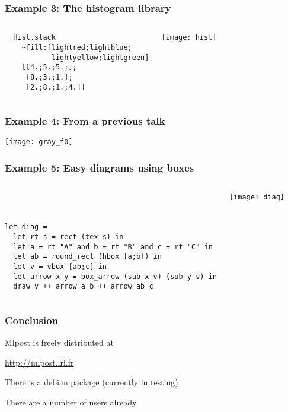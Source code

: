 \documentclass[nodefaultblocks]{beamer}
\begin{document}
\begin{frame}[fragile]
\frametitle{Example 3: The histogram library}
\begin{columns}
\begin{verbatim}
  Hist.stack 
    ~fill:[lightred;lightblue;
           lightyellow;lightgreen]
    [[4.;5.;5.;]; 
     [8.;3.;1.]; 
     [2.;8.;1.;4.]]  
\end{verbatim}
\begin{center}
  \texttt{[image: hist]}
\end{center}

\end{columns}

\end{frame}
\begin{frame}
\frametitle{Example 4: From a previous talk}

\begin{center}
\texttt{[image: gray\_f0]}
\end{center}
\end{frame}

\begin{frame}[fragile]
\frametitle{Example 5: Easy diagrams using boxes}
\begin{columns}
\small
\begin{verbatim}



let diag =
  let rt s = rect (tex s) in
  let a = rt "A" and b = rt "B" and c = rt "C" in
  let ab = round_rect (hbox [a;b]) in
  let v = vbox [ab;c] in
  let arrow x y = box_arrow (sub x v) (sub y v) in
  draw v ++ arrow a b ++ arrow ab c 
\end{verbatim}
\texttt{[image: diag]}
\end{columns}

\end{frame}

\begin{frame}\frametitle{Conclusion}

Mlpost is freely distributed at

\begin{center}
  \url{http://mlpost.lri.fr}
\end{center}

There is a debian package (currently in testing)

There are a number of users already

\end{frame}
\end{document}

